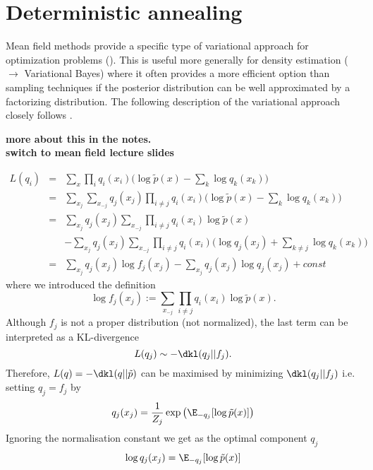 \section{Deterministic annealing} \label{sec:determ-anne}

\begin{frame}

Mean field methods provide a specific type of variational approach for
optimization problems (\cite{Bishop2006,Murphy2012}). This is useful
more generally for density estimation ($\rightarrow$ Variational
Bayes) where it often provides a more efficient option than sampling
techniques if the posterior distribution can be well approximated by a
factorizing distribution. The following description of the variational
approach closely follows \citep[ch. 21.3]{Murphy2012}.

\textbf{more about this in the notes.}\\
\textbf{switch to mean field lecture slides}

\end{frame}

\begin{eqnarray*}
  \label{eq:1}
 L(q_i) & = & \sum_x \prod_i q_i(x_i) \Big( \log \tilde{p}(x) - \sum_k \log q_k(x_k) \Big) \\
 & = & \sum_{x_j} \sum_{x_{-j}} q_j (x_j) \prod_{i \neq j} q_i(x_i) \Big( \log \tilde{p}(x) - \sum_k \log q_k(x_k)   \Big) \\ 
 & = & \sum_{x_j} q_j(x_j) \sum_{x_{-j}} \prod_{i \neq j} q_i(x_i) \log \tilde{p}(x) \\
& &  - \sum_{x_j} q_j(x_j) \sum_{x_{-j}} \prod_{i \neq j} q_i(x_i) \Big(\log q_j(x_j)+ \sum_{k \neq j} \log q_k(x_k) \Big) \\ 
& = &  \sum_{x_j} q_j(x_j) \log f_j(x_j) - \sum_{x_j} q_j(x_j) \log q_j(x_j) +  const
\end{eqnarray*}
where we introduced the definition
$$
\log f_j(x_j):= \sum_{x_{-j}} \prod_{i \neq j} q_i(x_i) \log
\tilde{p}(x). 
$$
Although $f_j$ is not a proper distribution (not normalized), the last
term can be interpreted as a KL-divergence
$$
L(q_j) \sim - \dkl(q_j||f_j).
$$
Therefore, $L(q) = - \dkl(q||\tilde{p})$ can be maximised by
minimizing $\dkl(q_j||f_j)$  i.e. setting $q_j = f_j$ by
$$
q_j(x_j) = \frac{1}{Z_j} \exp\big(\E_{-q_j}[\log \tilde{p}(x)]\big)
$$
Ignoring the normalisation constant we get as the optimal component $q_j$
\begin{equation}
  \label{eq:MeanField}
\log q_j(x_j) = \E_{-q_j}[\log \tilde{p}(x)]  
\end{equation}

